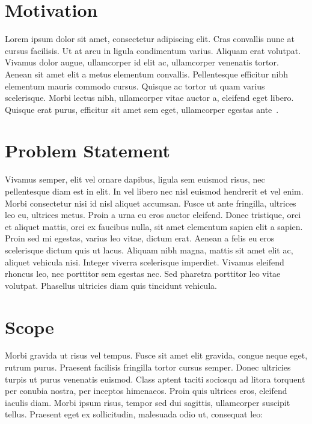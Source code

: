 \section{Motivation}
Lorem ipsum dolor sit amet, consectetur adipiscing elit. Cras convallis nunc at cursus facilisis. Ut at arcu in ligula condimentum varius. Aliquam erat volutpat. Vivamus dolor augue, ullamcorper id elit ac, ullamcorper venenatis tortor. Aenean sit amet elit a metus elementum convallis. Pellentesque efficitur nibh elementum mauris commodo cursus. Quisque ac tortor ut quam varius scelerisque. Morbi lectus nibh, ullamcorper vitae auctor a, eleifend eget libero. Quisque erat purus, efficitur sit amet sem eget, ullamcorper egestas ante~\cite{knuth:1984}.

\section{Problem Statement}
Vivamus semper, elit vel ornare dapibus, ligula sem euismod risus, nec pellentesque diam est in elit. In vel libero nec nisl euismod hendrerit et vel enim. Morbi consectetur nisi id nisl aliquet accumsan. Fusce ut ante fringilla, ultrices leo eu, ultrices metus. Proin a urna eu eros auctor eleifend. Donec tristique, orci et aliquet mattis, orci ex faucibus nulla, sit amet elementum sapien elit a sapien. Proin sed mi egestas, varius leo vitae, dictum erat. Aenean a felis eu eros scelerisque dictum quis ut lacus. Aliquam nibh magna, mattis sit amet elit ac, aliquet vehicula nisi. Integer viverra scelerisque imperdiet. Vivamus eleifend rhoncus leo, nec porttitor sem egestas nec. Sed pharetra porttitor leo vitae volutpat. Phasellus ultricies diam quis tincidunt vehicula.

\section{Scope}
Morbi gravida ut risus vel tempus. Fusce sit amet elit gravida, congue neque eget, rutrum purus. Praesent facilisis fringilla tortor cursus semper. Donec ultricies turpis ut purus venenatis euismod. Class aptent taciti sociosqu ad litora torquent per conubia nostra, per inceptos himenaeos. Proin quis ultrices eros, eleifend iaculis diam. Morbi ipsum risus, tempor sed dui sagittis, ullamcorper suscipit tellus. Praesent eget ex sollicitudin, malesuada odio ut, consequat leo:

